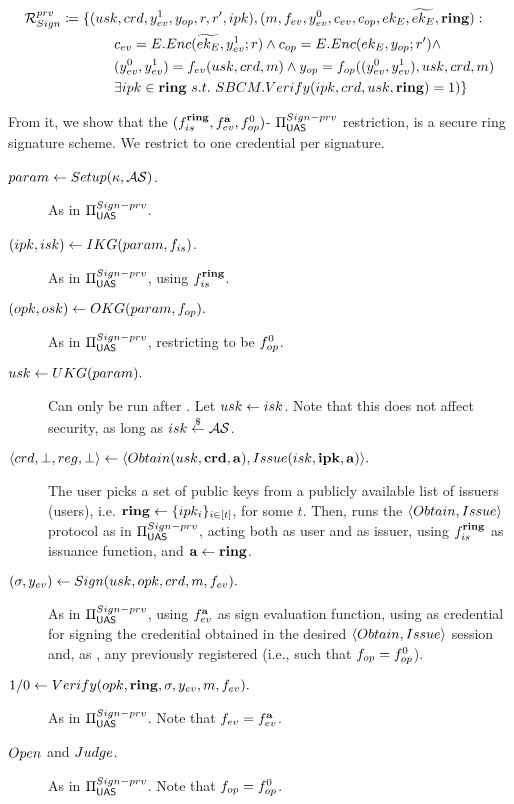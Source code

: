 \begin{align}
  & \mathcal{R}_{Sign}^{prv} \coloneqq \lbrace (usk,crd,y_{ev}^1,y_{op},r,r',
    ipk),(m,f_{ev},y_{ev}^0,c_{ev},c_{op},ek_{E},\widetilde{ek_{E}},\mathbf{ring}): \nonumber \\
  & \hspace*{6.405em}c_{ev} = E.Enc(\widetilde{ek_{E}},y_{ev}^1;r) \land
    c_{op} = E.Enc(ek_{E},y_{op};r') \land \nonumber \\
  & \hspace*{6.40em}(y_{ev}^0,y_{ev}^1) = f_{ev}(usk,crd,m) \land
    y_{op} = f_{op}((y_{ev}^0,y_{ev}^1),usk,crd,m) \nonumber \\
  & \hspace*{6.40em}\exists ipk \in \mathbf{ring}~s.t.~SBCM.Verify(ipk,crd,usk,
    \mathbf{ring}) = 1) \rbrace \label{eq:sign-prv}
\end{align}

From it, we show that the $(f_{is}^{\mathbf{ring}},f_{ev}^{\mathbf{a}},f_{op}^0)$-
$\Pi_{\mathsf{UAS}}^{Sign-prv}$ restriction, is a secure ring signature scheme. We
restrict to one credential per signature.

\begin{description}  
\item[$param \gets Setup(\kappa,\mathcal{AS})$.] As in $\Pi_{\mathsf{UAS}}^{Sign-prv}$.  
\item[$(ipk,isk) \gets IKG(param,f_{is})$.] As in
  $\Pi_{\mathsf{UAS}}^{Sign-prv}$, using $f_{is}^{\mathbf{ring}}$.  
\item[$(opk,osk) \gets OKG(param,f_{op}).$] As in $\Pi_{\mathsf{UAS}}^{Sign-prv}$,
  restricting \finsp to be $f_{op}^0$.  
\item[$usk \gets UKG(param).$] Can only be run after \IKeyGen. Let 
  $usk \gets isk$. Note that this does not affect security, as long as
  $isk \stackrel{\$}{\gets} \mathcal{AS}$.
\item[$\langle crd,\bot,reg,\bot \rangle \gets
  \langle Obtain(usk,\mathbf{crd},\mathbf{a}),Issue(isk,\mathbf{ipk},\mathbf{a})\rangle.$]
  The user picks a set of public keys from a publicly available list of issuers
  (users), i.e. $\mathbf{ring} \gets \lbrace ipk_i \rbrace_{i \in [t]}$, for some $t$.
  Then, runs the $\langle Obtain,Issue \rangle$ protocol as in
  $\Pi_{\mathsf{UAS}}^{Sign-prv}$, acting both as user and as issuer, using
  $f_{is}^{\mathbf{ring}}$ as issuance function, and $\mathbf{a} \gets \mathbf{ring}$.
\item[$(\sigma,y_{ev}) \gets Sign(usk,opk,crd,m,f_{ev}).$] As in
  $\Pi_{\mathsf{UAS}}^{Sign-prv}$, using $f_{ev}^{\mathbf{a}}$ as sign evaluation function,
  using as credential for signing the credential obtained in the desired
  $\langle Obtain,Issue \rangle$ session and, as \opk, any previously
  registered \opk (i.e., such that $f_{op}=f_{op}^0$).
\item[$1/0 \gets Verify(opk,\mathbf{ring},\sigma,y_{ev},m,f_{ev}).$] As in
  $\Pi_{\mathsf{UAS}}^{Sign-prv}$. Note that $f_{ev}=f_{ev}^{\mathbf{a}}$.
\item[$Open$ and $Judge$.] As in $\Pi_{\mathsf{UAS}}^{Sign-prv}$. Note that
  $f_{op}=f_{op}^0$.
\end{description}

